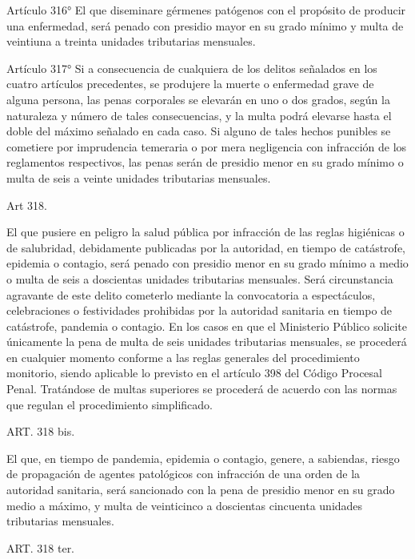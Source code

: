     Artículo 316° El que diseminare gérmenes patógenos con el propósito de producir una enfermedad, será penado con presidio mayor en su grado mínimo y multa de veintiuna a treinta unidades tributarias mensuales.


    Artículo 317° Si a consecuencia de cualquiera de los delitos señalados en los cuatro artículos precedentes, se produjere la muerte o enfermedad grave de alguna persona, las penas corporales se elevarán en uno o dos grados, según la naturaleza y número de tales consecuencias, y la multa podrá elevarse hasta el doble del máximo señalado en cada caso.
    Si alguno de tales hechos punibles se cometiere por imprudencia temeraria o por mera negligencia con infracción de los reglamentos respectivos, las penas serán de presidio menor en su grado mínimo o multa de seis a veinte unidades tributarias mensuales.






    Art 318.

    El que pusiere en peligro la salud pública por infracción de las reglas higiénicas o de salubridad, debidamente publicadas por la autoridad, en tiempo de catástrofe, epidemia o contagio, será penado con presidio menor en su grado mínimo a medio o multa de seis a doscientas unidades tributarias mensuales.
    Será circunstancia agravante de este delito cometerlo mediante la convocatoria a espectáculos, celebraciones o festividades prohibidas por la autoridad sanitaria en tiempo de catástrofe, pandemia o contagio.
    En los casos en que el Ministerio Público solicite únicamente la pena de multa de seis unidades tributarias mensuales, se procederá en cualquier momento conforme a las reglas generales del procedimiento monitorio, siendo aplicable lo previsto en el artículo 398 del Código Procesal Penal. Tratándose de multas superiores se procederá de acuerdo con las normas que regulan el procedimiento simplificado.







    ART. 318 bis.

    El que, en tiempo de pandemia, epidemia o contagio, genere, a sabiendas, riesgo de propagación de agentes patológicos con infracción de una orden de la autoridad sanitaria, será sancionado con la pena de presidio menor en su grado medio a máximo, y multa de veinticinco a doscientas cincuenta unidades tributarias mensuales.


    ART. 318 ter.

